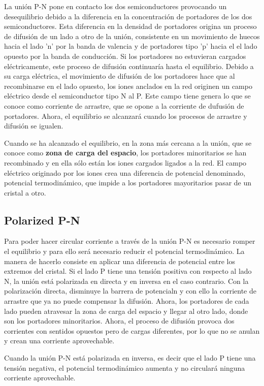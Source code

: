 La unión P-N pone en contacto los dos semiconductores provocando un desequilibrio debido a la diferencia en la concentración de portadores de los dos semiconductores. Esta diferencia en la densidad de portadores origina un proceso de difusión de un lado a otro de la unión, consistente en un movimiento de huecos hacia el lado 'n' por la banda de valencia y de portadores tipo 'p' hacia el el lado opuesto por la banda de conducción. Si los portadores no estuvieran cargados eléctricamente, este proceso de difusión continuaría hasta el equilibrio. Debido a su carga eléctrica, el movimiento de difusión de los portadores hace que al recombinarse en el lado opuesto,  los iones anclados en la red originen un campo eléctrico desde el semiconductor tipo N al P. Este campo tiene  genera lo que se conoce como corriente de arrastre, que se opone a la corriente de dufusión de portadores. Ahora, el equilibrio se alcanzará cuando los procesos de arrastre y difusión se igualen.

Cuando se ha alcanzado el equilibrio, en la zona más cercana a la unión, que se conoce como \textbf{zona de carga del espacio}, los portadores minoritarios se han recombinado y en ella sólo están los iones cargados ligados a la red. El campo eléctrico originado por los iones crea una diferencia de potencial denominado, potencial termodinámico, que impide a los portadores mayoritarios pasar de un cristal a otro.

\subsection{Polarized P-N}

Para poder hacer circular corriente a través de la unión P-N es necesario romper el equilibrio y para ello será necesario reducir el potencial termodinámico. La manera de hacerlo consiste en aplicar una diferencia de potencial entre los extremos del cristal. Si el lado P tiene una tensión positiva con respecto al lado N, la unión está polarizada en directa y en inversa en el caso contrario. Con la polarización directa, disminuye la barrera de potencialn y con ello la corriente de arrastre que ya no puede compensar la difusión. Ahora, los portadores de cada lado pueden atravesar la zona de carga del espacio y llegar al otro lado, donde son los portadores minoritarios. Ahora, el proceso de difusión provoca dos corrientes con sentidos opuestos pero de cargas diferentes, por lo que no se anulan y crean una corriente aprovechable.

Cuando la unión P-N está polarizada en inversa, es decir que el lado P tiene una tensión negativa, el potencial termodinámico aumenta y no circulará ninguna corriente aprovechable.

